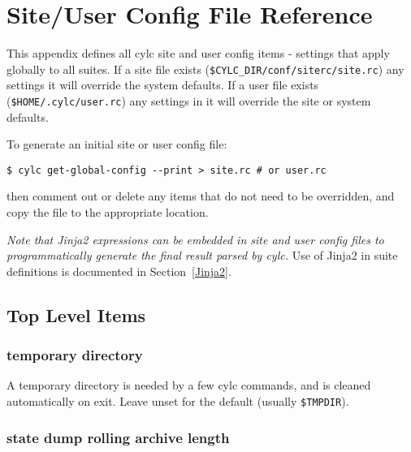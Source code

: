 
\section{Site/User Config File Reference}
\label{SiteRCReference}

\lstset{language=bash}

This appendix defines all cylc site and user config items - settings
that apply globally to all suites. If a site file exists 
(\lstinline=$CYLC_DIR/conf/siterc/site.rc=) any settings it will
override the system defaults. If a user file exists 
(\lstinline=$HOME/.cylc/user.rc=) any settings in it will  
override the site or system defaults.

To generate an initial site or user config file:
\begin{lstlisting}
$ cylc get-global-config --print > site.rc # or user.rc
\end{lstlisting}
then comment out or delete any items that do not need to be overridden, 
and copy the file to the appropriate location.

{\em Note that Jinja2 expressions can be embedded in site and user
config files to programmatically generate the final result parsed by
cylc.}  Use of Jinja2 in suite definitions is documented in
Section~\ref{Jinja2}.

\subsection{Top Level Items}

\subsubsection{temporary directory}

A temporary directory is needed by a few cylc commands, and is cleaned
automatically on exit. Leave unset for the default (usually
\lstinline=$TMPDIR=).


\subsubsection{state dump rolling archive length}

